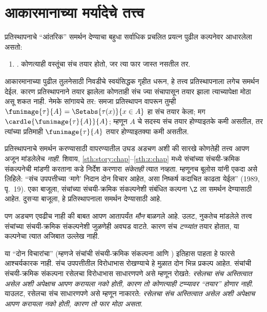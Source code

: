 \section{आकारमानाच्या मर्यादेचे तत्त्व}\label{sth:replacement:limofsize:sec}

प्रतिस्थापनाचे ``आंतरिक'' समर्थन देण्याचा बहुधा सर्वाधिक प्रचलित प्रयत्न पुढील कल्पनेवर आधारलेला असतो:
\begin{enumerate}
  \item[] \limofsize. कोणत्याही वस्तूंचा संच तयार होतो, जर त्या फार जास्त नसतील तर.
\end{enumerate}
आकारमानाच्या पुढील तुलनेसाठी निवडीचे स्वयंसिद्धक गृहीत धरून, हे तत्त्व प्रतिस्थापनाला लगेच समर्थन देईल. कारण प्रतिस्थापनाने तयार झालेला कोणताही संच ज्या संचापासून तयार झाला त्याच्यापेक्षा मोठा असू शकत नाही. नेमके सांगायचे तर: समजा प्रतिस्थापन वापरून तुम्ही
$\funimage{\tau}{A} = \Setabs{\tau(x)}{x \in A}$ हा संच तयार केला; मग $\cardle{\funimage{\tau}{A}}{A}$; म्हणून $A$ चे सदस्य संच तयार होण्याइतके कमी असतील, तर त्यांच्या प्रतिमाही $\funimage{\tau}{A}$ तयार होण्याइतक्या कमी असतील.

प्रतिस्थापनाचे समर्थन करण्यासाठी \limofsize{} वापरण्यातील उघड अडचण अशी की \limofsize{} सारखे कोणतेही तत्त्व आपण अजून मांडलेलेच \emph{नाही}. शिवाय, \ref{sth:story:chap}--\ref{sth:z:chap} मध्ये संचांच्या संचयी-क्रमिक संकल्पनेची मांडणी करताना \limofsize{} कडे निर्देश करणारा \emph{संकेतही} त्यात नव्हता. म्हणूनच बूलोस यांनी एकदा असे लिहिले: ``संच उपपत्तीच्या `मागे' निदान दोन विचार आहेत, असा निष्कर्ष कदाचित काढता येईल'' (1989, पृ.~19). एका बाजूला, संचांच्या संचयी-क्रमिक संकल्पनेशी संबंधित कल्पना $\Z$ ला समर्थन देण्यासाठी आहेत. दुसऱ्या बाजूला, \limofsize{} हे प्रतिस्थापनाला समर्थन देण्यासाठी आहे.

पण अडचण एवढीच नाही की \limofsize{} बाबत आपण आतापर्यंत \emph{मौन} बाळगले आहे. उलट, नुकतेच मांडलेले \limofsize{} तत्त्व संचांच्या संचयी-क्रमिक संकल्पनेशी जुळणेही अवघड वाटते. कारण संच \emph{टप्प्यांत} तयार होतात, या कल्पनेचा त्यात अजिबात उल्लेख नाही.

या ``दोन विचारांचा'' (म्हणजे संचांची संचयी-क्रमिक संकल्पना आणि \limofsize) इतिहास पाहता हे फारसे आश्चर्यकारक नाही. संच उपपत्तीतील विरोधाभास रोखण्याचे हे मुळात दोन भिन्न प्रकल्प आहेत. संचांची संचयी-क्रमिक संकल्पना रसेलचा विरोधाभास साधारणपणे असे म्हणून रोखते: \emph{रसेलचा संच अस्तित्वात असेल अशी अपेक्षाच आपण करायला नको होती, कारण तो कोणत्याही टप्प्यावर ``तयार'' होणार नाही}. याउलट, \limofsize{} रसेलचा संच साधारणपणे असे म्हणून नाकारते: \emph{रसेलचा संच अस्तित्वात असेल अशी अपेक्षाच आपण करायला नको होती, कारण तो फार मोठा असता}.

